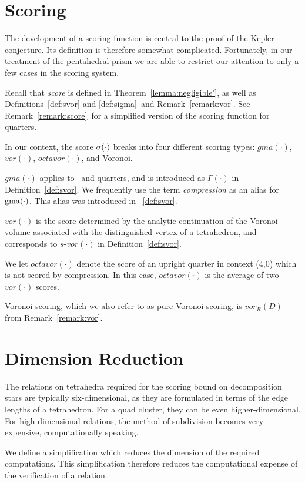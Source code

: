 \section{Scoring}
The development of a scoring function is central to the proof of the Kepler conjecture.  Its
definition is therefore somewhat complicated.  Fortunately, in our treatment of the
pentahedral prism we are able to restrict our attention to only a few cases in
the scoring system.

Recall that {\em score} is defined in
Theorem~\ref{lemma:negligible'}\tomcite, as well as
Definitions~\ref{def:svor} and \ref{def:sigma}\tomcite\ and
Remark~\ref{remark:vor}\tomcite{}. See
Remark~\ref{remark:score}\tomcite\ for a simplified version of the
scoring function for quarters.

In our context, the score $\operatorname{\sigma}(\cdot)$ breaks into four different scoring types:
$gma(\cdot)$, $vor(\cdot)$, $octavor(\cdot)$, and Voronoi.

$gma(\cdot)$ applies to \qrtets\ and quarters, and is introduced as
$\Gamma(\cdot)$ in Definition~\ref{def:svor}\tomcite{}.  We
frequently use the term {\it compression\/} as an alias for
$\operatorname{gma}(\cdot)$.  This alias was introduced in \Chap~\ref{def:svor}.

$vor(\cdot)$ is the score determined by the analytic continuation of
the Voronoi volume associated with the distinguished vertex of a
tetrahedron, and corresponds to $s\text{-}vor(\cdot)$ in
Definition~\ref{def:svor}\tomcite{}.

We let $octavor(\cdot)$ denote the score of an upright quarter in context (4,0) which is
not scored by compression.  In this case, $octavor(\cdot)$ is the average of two $vor(\cdot)$ scores.

Voronoi scoring, which we also refer to as pure Voronoi scoring, is
$vor_R(D)$ from Remark~\ref{remark:vor}\tomcite{}.


\section{Dimension Reduction}
The relations on tetrahedra required for
the scoring bound on decomposition stars are typically
six-dimensional, as they are formulated in terms of
the edge lengths of a tetrahedron.  For a quad cluster, they can be even
higher-dimensional.  For high-dimensional relations,
the method of subdivision becomes very expensive,
computationally speaking.

We define a simplification which reduces the dimension
of the required computations.  This simplification
therefore reduces the computational expense of the
verification of a relation.

